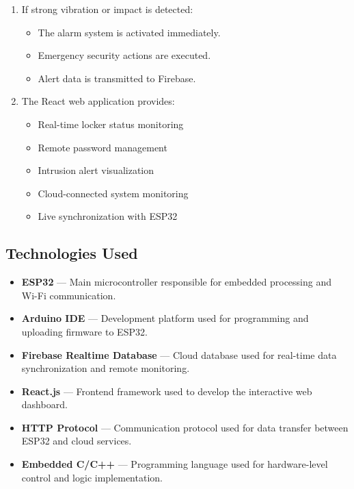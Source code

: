 \documentclass[conference]{IEEEtran}
\begin{document}
\begin{enumerate}
\item If strong vibration or impact is detected:
\begin{itemize}
\item The alarm system is activated immediately.
\item Emergency security actions are executed.
\item Alert data is transmitted to Firebase.
\end{itemize}

\item The React web application provides:
\begin{itemize}
\item Real-time locker status monitoring
\item Remote password management
\item Intrusion alert visualization
\item Cloud-connected system monitoring
\item Live synchronization with ESP32
\end{itemize}

\end{enumerate}

\subsection{Technologies Used}

\begin{itemize}

\item \textbf{ESP32} --- Main microcontroller responsible for embedded processing and Wi-Fi communication.

\item \textbf{Arduino IDE} --- Development platform used for programming and uploading firmware to ESP32.

\item \textbf{Firebase Realtime Database} --- Cloud database used for real-time data synchronization and remote monitoring.

\item \textbf{React.js} --- Frontend framework used to develop the interactive web dashboard.

\item \textbf{HTTP Protocol} --- Communication protocol used for data transfer between ESP32 and cloud services.

\item \textbf{Embedded C/C++} --- Programming language used for hardware-level control and logic implementation.

\end{itemize}
\end{document}
